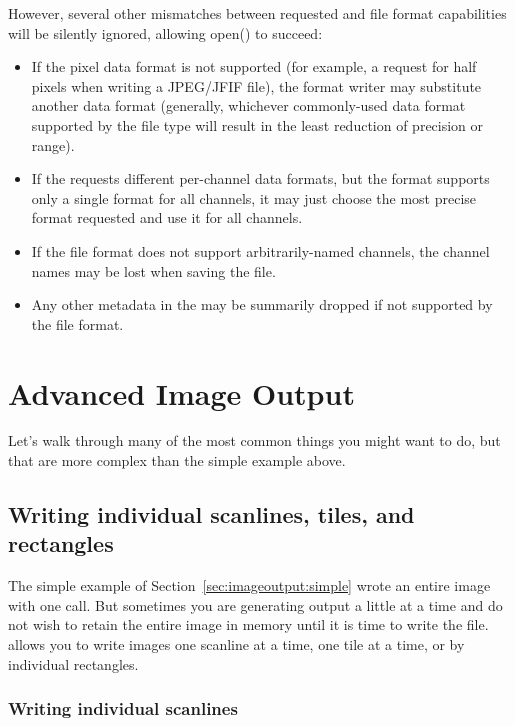 However, several other mismatches between requested \ImageSpec and file
format capabilities will be silently ignored, allowing {\cf open()} to
succeed:

\begin{itemize}
\item If the pixel data format is not supported (for example, a request for
  {\cf half} pixels when writing a JPEG/JFIF file), the format writer
  may substitute another data format (generally, whichever commonly-used
  data format supported by the file type will result in the least reduction
  of precision or range).
\item If the \ImageSpec requests different per-channel data formats, but
  the format supports only a single format for all channels, it may just
  choose the most precise format requested and use it for all channels.
\item If the file format does not support arbitrarily-named channels, the
  channel names may be lost when saving the file.
\item Any other metadata in the \ImageSpec may be summarily dropped if not
  supported by the file format.
\end{itemize}


\section{Advanced Image Output}
\label{sec:imageoutput:advanced}

Let's walk through many of the most common things you might want to do,
but that are more complex than the simple example above.

\subsection{Writing individual scanlines, tiles, and rectangles}
\label{sec:imageoutput:scanlinestiles}

The simple example of Section~\ref{sec:imageoutput:simple} wrote an
entire image with one call.  But sometimes you are generating output a
little at a time and do not wish to retain the entire image in memory
until it is time to write the file.  \product allows you to write images
one scanline at a time, one tile at a time, or by individual rectangles.

\subsubsection{Writing individual scanlines}

